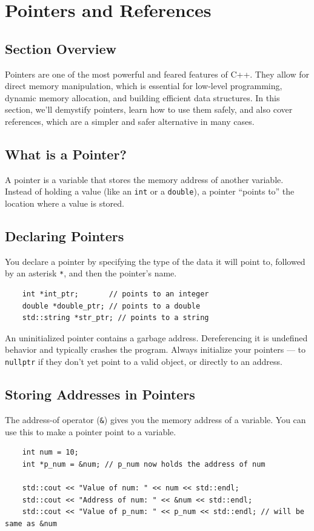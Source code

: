 \section{Pointers and References}

\subsection{Section Overview}
Pointers are one of the most powerful and feared features of C++. They allow for direct memory manipulation, which is essential for low-level programming, dynamic memory allocation, and building efficient data structures. In this section, we'll demystify pointers, learn how to use them safely, and also cover references, which are a simpler and safer alternative in many cases.

\subsection{What is a Pointer?}
A pointer is a variable that stores the memory address of another variable. Instead of holding a value (like an \texttt{int} or a \texttt{double}), a pointer ``points to'' the location where a value is stored.

\subsection{Declaring Pointers}
You declare a pointer by specifying the type of the data it will point to, followed by an asterisk \texttt{*}, and then the pointer's name.
\begin{lstlisting}
	int *int_ptr;       // points to an integer
	double *double_ptr; // points to a double
	std::string *str_ptr; // points to a string
\end{lstlisting}
\begin{remark}
	An uninitialized pointer contains a garbage address. Dereferencing it is undefined behavior and typically crashes the program. Always initialize your pointers — to \texttt{nullptr} if they don't yet point to a valid object, or directly to an address.
\end{remark}

\subsection{Storing Addresses in Pointers}
The address-of operator (\texttt{\&}) gives you the memory address of a variable. You can use this to make a pointer point to a variable.
\begin{lstlisting}
	int num = 10;
	int *p_num = &num; // p_num now holds the address of num

	std::cout << "Value of num: " << num << std::endl;
	std::cout << "Address of num: " << &num << std::endl;
	std::cout << "Value of p_num: " << p_num << std::endl; // will be same as &num
\end{lstlisting}

